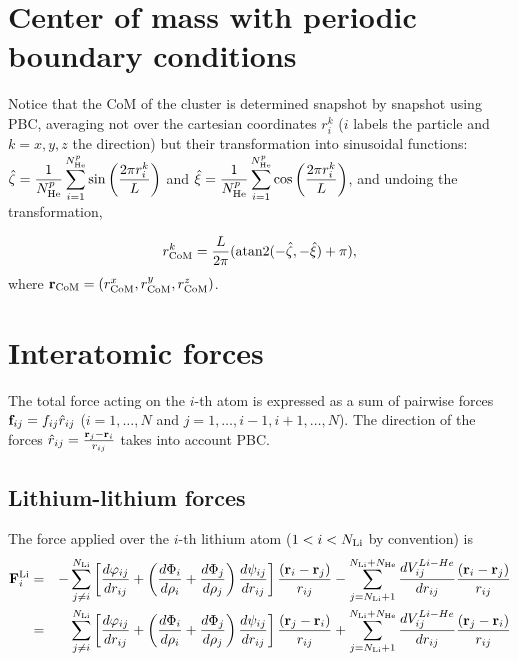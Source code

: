 \documentclass[jcp,amsmath,amssymb,preprint]{revtex4-1}
\begin{document}
\section{Center of mass with periodic boundary conditions}

Notice that the CoM of the cluster is determined snapshot by snapshot using PBC, averaging not over the cartesian coordinates $r_i^k$ ($i$ labels the particle and $k = x,y,z$ the direction) but their transformation into sinusoidal functions: $\displaystyle \hat{\zeta} = \frac{1}{N^p_{\rm He}}\sum_{i=1}^{N^p_{\rm He}} {\sin{\left(\frac{2 \pi r_i^k}{L}\right)}}$ and $\displaystyle \hat{\xi} = \frac{1}{N^p_{\rm He}}\sum_{i=1}^{N^p_{\rm He}} {\cos{\left(\frac{2 \pi r_i^k}{L}\right)}}$, and undoing the transformation,

\begin{eqnarray}
        {r}_{\rm CoM}^k =  \frac{L}{2 \pi} ({\rm atan2}({-\hat{\zeta},-\hat{\xi}}) + \pi),
\end{eqnarray}
where ${\bf r}_{\rm CoM} = ({r}_{\rm CoM}^x,{r}_{\rm CoM}^y,{r}_{\rm CoM}^z)$.

\section{Interatomic forces}

The total force acting on the $i$-th atom is expressed as a sum of pairwise forces ${\bf f}_{ij} = f_{ij} \hat{r}_{ij}$ ($i=1,\dots,N$ and $j=1,\dots,i-1,i+1,\dots,N$). The direction of the forces $\hat{r}_{ij} = \frac{{\bf r}_j - {\bf r}_i}{r_{ij}}$ takes into account PBC.    

\subsection{Lithium-lithium forces}

The force applied over the $i$-th lithium atom ($1 < i < N_{\rm Li}$ by convention) is
\begin{eqnarray} \label{force_Li}
    {\bf F}_i^{\rm Li} &=& 
    -\sum_{j \ne i}^{N_{\rm Li}} \left[ \frac{d \varphi_{ij}}{d r_{ij}} + \left( \frac{d \Phi_i}{d \rho_i} + \frac{d \Phi_j}{d \rho_j}\right)\frac{d \psi_{ij}}{d r_{ij}} \right]\frac{({\bf r}_i-{\bf r}_j)}{r_{ij}} 
    - \sum_{j = N_{\rm Li}+1}^{N_{\rm Li}+N_{\rm He}} \frac{dV^{Li-He}_{ij}}{dr_{ij}} \frac{({\bf r}_i-{\bf r}_j)}{r_{ij}} \\ \nonumber
    &=& \sum_{j \ne i}^{N_{\rm Li}} \left[ \frac{d \varphi_{ij}}{d r_{ij}} + \left( \frac{d \Phi_i}{d \rho_i} + \frac{d \Phi_j}{d \rho_j}\right)\frac{d \psi_{ij}}{d r_{ij}} \right]\frac{({\bf r}_j-{\bf r}_i)}{r_{ij}} 
    + \sum_{j = N_{\rm Li}+1}^{N_{\rm Li}+N_{\rm He}} \frac{dV^{Li-He}_{ij}}{dr_{ij}} \frac{({\bf r}_j-{\bf r}_i)}{r_{ij}} 
\end{eqnarray}
\end{document}
